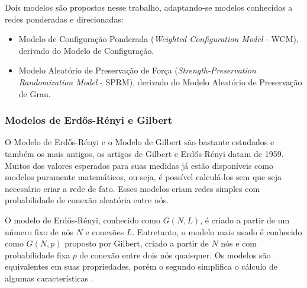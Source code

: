 \documentclass[12pt,a4paper,final]{article}
\begin{document}
Dois modelos são propostos nesse trabalho, adaptando-se modelos conhecidos a redes ponderadas e direcionadas:
\begin{itemize}
\item Modelo de Configuração Ponderada (\textit{Weighted Configuration Model} - WCM), derivado do Modelo de Configuração.
\item Modelo Aleatório de Preservação de Força (\textit{Strength-Preservation Randomization Model} - SPRM), derivado do Modelo Aleatório de Preservação de Grau.
\end{itemize}


\subsubsection{Modelos de Erdős-Rényi e Gilbert}

O Modelo de Erdős-Rényi e o Modelo de Gilbert são bastante estudados e também os mais antigos, os artigos de Gilbert e Erdős-Rényi datam de 1959. Muitos dos valores esperados para suas medidas já estão disponíveis como modelos puramente matemáticos, ou seja, é possível calculá-los sem que seja necessário criar a rede de fato. Esses modelos criam redes simples com probabilidade de conexão aleatória entre nós.

O modelo de Erdős-Rényi, conhecido como $G(N,L)$, é criado a partir de um número fixo de nós $N$ e conexões $L$. Entretanto, o modelo mais usado é conhecido como $G(N,p)$ proposto por Gilbert, criado a partir de $N$ nós e com probabilidade fixa $p$ de conexão entre dois nós quaisquer. Os modelos são equivalentes em suas propriedades, porém o segundo simplifica o cálculo de algumas características \cite{Barabasi2016-rn}.
\end{document}
